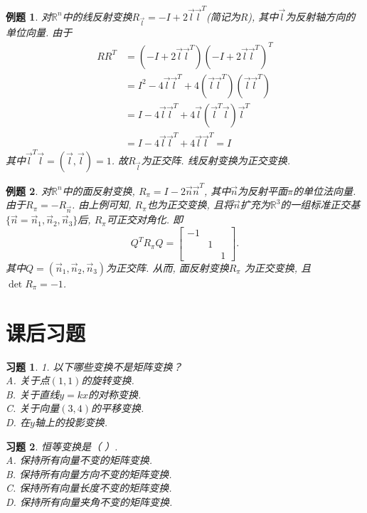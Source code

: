 \documentclass[a4paper]{book}
\newtheorem{eg}{例题}[chapter]
\newtheorem{ex}{习题}[chapter]
\begin{document}
\begin{eg}
对$\mathbb{R}^n$中的线反射变换$R_{\vec{l}}=-I+2\vec{l}\vec{l}^T$(简记为$R$), 其中$\vec{l}$为反射轴方向的单位向量. 由于
\begin{displaymath}\begin{aligned}
RR^T&=(-I+2\vec{l}\vec{l}^T)(-I+2\vec{l}\vec{l}^T)^T\\
&=I^2-4\vec{l}\vec{l}^T+4(\vec{l}\vec{l}^T)(\vec{l}\vec{l}^T)\\
&=I-4\vec{l}\vec{l}^T+4\vec{l}(\vec{l}^T\vec{l})\vec{l}^T\\
&=I-4\vec{l}\vec{l}^T+4\vec{l}\vec{l}^T=I\end{aligned}\end{displaymath}
其中$\vec{l}^T\vec{l}=(\vec{l},\vec{l})=1$. 故$R_{\vec{l}}$为正交阵. 线反射变换为正交变换.
\end{eg}

\begin{eg}
对$\mathbb{R}^n$中的面反射变换, $R_{\pi}=I-2\vec{n}\vec{n}^T$, 其中$\vec{n}$为反射平面$\pi$的单位法向量. 由于$R_{\pi}=-R_{\vec{n}}$. 由上例可知, $R_{\pi}$也为正交变换, 且将$\vec{n}$扩充为$\mathbb{R}^3$的一组标准正交基$\{\vec{n}=\vec{n}_1,\vec{n}_2,\vec{n}_3\}$后, $R_{\pi}$可正交对角化. 即
$$Q^TR_{\pi}Q=\begin{bmatrix} -1&&\\&1&\\&&1\end{bmatrix}.$$
其中$Q=(\vec{n}_1,\vec{n}_2,\vec{n}_3)$为正交阵. 从而, 面反射变换$R_{\pi}$ 为正交变换, 且$\det R_{\pi}=-1$.
\end{eg}


\section{课后习题}
\begin{ex}\label{8.1}
1. 以下哪些变换不是矩阵变换？\\
A. 关于点$(1,1)$的旋转变换.\\		
B. 关于直线$y=kx$的对称变换.\\
C. 关于向量$(3,4)$的平移变换.\\		
D. 在$y$轴上的投影变换.
\end{ex}

\begin{ex}\label{8.2}
恒等变换是（    ）.\\
A. 保持所有向量不变的矩阵变换.\\
B. 保持所有向量方向不变的矩阵变换.\\
C. 保持所有向量长度不变的矩阵变换.\\
D. 保持所有向量夹角不变的矩阵变换.
\end{ex}
\end{document}
